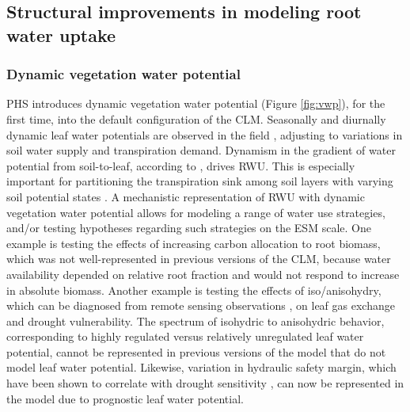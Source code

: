 \documentclass[draft,linenumbers]{agujournal}
\begin{document}
    
\subsection{Structural improvements in modeling root water uptake}

\subsubsection{Dynamic vegetation water potential}

PHS introduces dynamic vegetation water potential (Figure \ref{fig:vwp}), for the first time, into the default configuration of the CLM.
Seasonally and diurnally dynamic leaf water potentials are observed in the field \citep{fisher2006}, adjusting to variations in soil water supply and transpiration demand.
Dynamism in the gradient of water potential from soil-to-leaf, according to , drives RWU.
This is especially important for partitioning the transpiration sink among soil layers with varying soil potential states \citep{jarvis2011}.
A mechanistic representation of RWU with dynamic vegetation water potential allows for modeling a range of water use strategies, and/or testing hypotheses regarding such strategies on the ESM scale. One example is testing the effects of increasing carbon allocation to root biomass, which was not well-represented in previous versions of the CLM, because water availability depended on relative root fraction and would not respond to increase in absolute biomass. Another example is testing the effects of iso/anisohydry, which can be diagnosed from remote sensing observations \citep{konings2017a}, on leaf gas exchange and drought vulnerability. The spectrum of isohydric to anisohydric behavior, corresponding to highly regulated versus relatively unregulated leaf water potential, cannot be represented in previous versions of the model that do not model leaf water potential.
Likewise, variation in hydraulic safety margin, which have been shown to correlate with drought sensitivity \citep{anderegg2018}, can now be represented in the model due to prognostic leaf water potential.
\end{document}

